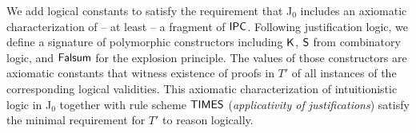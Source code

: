 \documentclass[11pt]{eptcs} %
\newcommand{\Turnj}[1]
	{ \Delta_0\vdash_{\sf J_0}  {#1}}
\begin{document}
%
We add logical constants to satisfy the requirement that {\sf J$_{0}$} includes an axiomatic characterization of -- at least -- a fragment of ${\sf IPC}$. Following justification logic,  we  define a signature of polymorphic constructors including {$\sf K$}, {$\sf S$} from combinatory logic, and {$\sf Falsum$} for the explosion principle. The values of those constructors are axiomatic constants  that witness existence of proofs in $T'$ of all instances of the corresponding logical validities. This axiomatic characterization of intuitionistic logic in  {\sf J$_{0}$} together with  rule scheme {$\sf TIMES$} (\textit{applicativity of justifications}) satisfy the minimal requirement for $T'$ to reason logically.  

\end{document}
